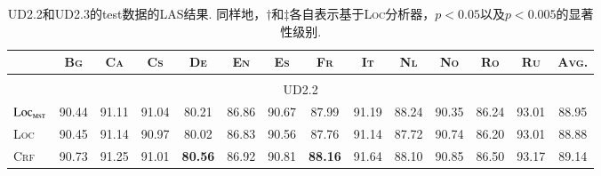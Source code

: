 \begin{table*}[tb]
  \setlength{\tabcolsep}{2.6pt}
  \centering
  \caption{UD2.2和UD2.3的test数据的LAS结果.
    同样地，$\dagger$和$\ddagger$各自表示基于\textsc{Loc}分析器，$p<0.05$以及$p<0.005$的显著性级别. }
  \begin{tabularx}{\textwidth}{lccccccccccccc}
    \toprule
                                      & \textsc{Bg}    & \textsc{Ca}    & \textsc{Cs}                      & \textsc{De}                     & \textsc{En}                     & \textsc{Es}                      & \textsc{Fr}                     & \textsc{It}                      & \textsc{Nl}                      & \textsc{No}                     & \textsc{Ro}                      & \textsc{Ru}                      & \textsc{Avg.}                    \\[1pt]
    \midrule
    \\[-15pt]
    \multicolumn{14}{c}{UD2.2}                                                                                                                                                                                                                                                                                                                                                                                                                                       \\[1pt]
    $\textsc{Loc}_{\textsc{mst}}$     & 90.44          & 91.11          & 91.04                            & 80.21                           & 86.86                           & 90.67                            & 87.99                           & 91.19                            & 88.24                            & 90.35                           & 86.24                            & 93.01                            & 88.95                            \\
    \textsc{Loc}                      & 90.45          & 91.14          & 90.97                            & 80.02                           & 86.83                           & 90.56                            & 87.76                           & 91.14                            & 87.72                            & 90.74                           & 86.20                            & 93.01                            & 88.88                            \\
    \textsc{Crf}                      & 90.73          & 91.25          & 91.01                            & \textbf{80.56}\rlap{$^\dagger$} & 86.92                           & 90.81\rlap{$^\dagger$}           & \textbf{88.16}                  & 91.64\rlap{$^\dagger$}           & 88.10                            & 90.85                           & 86.50                            & 93.17\rlap{$^\dagger$}           & 89.14\rlap{$^\ddagger$}          \\

\end{tabularx}
\end{table*}
